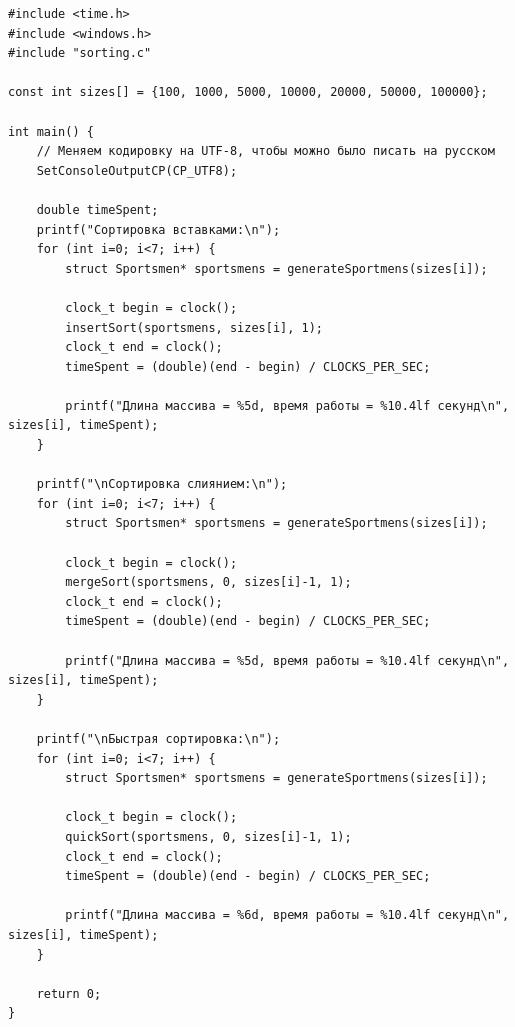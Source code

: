\documentclass[12pt]{article}
\begin{document}
\newpage

\begin{lstlisting}[label=timing.c, caption=timing.c]
#include <time.h>
#include <windows.h>
#include "sorting.c"

const int sizes[] = {100, 1000, 5000, 10000, 20000, 50000, 100000};

int main() {
    // Меняем кодировку на UTF-8, чтобы можно было писать на русском
    SetConsoleOutputCP(CP_UTF8);

    double timeSpent;
    printf("Сортировка вставками:\n");
    for (int i=0; i<7; i++) {
        struct Sportsmen* sportsmens = generateSportmens(sizes[i]);

        clock_t begin = clock();
        insertSort(sportsmens, sizes[i], 1);
        clock_t end = clock();
        timeSpent = (double)(end - begin) / CLOCKS_PER_SEC;

        printf("Длина массива = %5d, время работы = %10.4lf секунд\n", sizes[i], timeSpent);
    }

    printf("\nСортировка слиянием:\n");
    for (int i=0; i<7; i++) {
        struct Sportsmen* sportsmens = generateSportmens(sizes[i]);

        clock_t begin = clock();
        mergeSort(sportsmens, 0, sizes[i]-1, 1);
        clock_t end = clock();
        timeSpent = (double)(end - begin) / CLOCKS_PER_SEC;

        printf("Длина массива = %5d, время работы = %10.4lf секунд\n", sizes[i], timeSpent);
    }

    printf("\nБыстрая сортировка:\n");
    for (int i=0; i<7; i++) {
        struct Sportsmen* sportsmens = generateSportmens(sizes[i]);

        clock_t begin = clock();
        quickSort(sportsmens, 0, sizes[i]-1, 1);
        clock_t end = clock();
        timeSpent = (double)(end - begin) / CLOCKS_PER_SEC;

        printf("Длина массива = %6d, время работы = %10.4lf секунд\n", sizes[i], timeSpent);
    }

    return 0;
}
\end{lstlisting} 

\newpage

\end{document}
